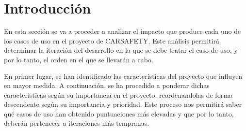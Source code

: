 \section{Introducción}
\par En esta sección se va a proceder a analizar el impacto que produce cada uno de los casos de uso en el proyecto de CARSAFETY. Este análisis permitirá determinar la iteración del desarrollo en la que se debe tratar el caso de uso, y por lo tanto, el orden en el que se llevarán a cabo.

\par En primer lugar, se han identificado las características del proyecto que influyen en mayor medida. A continuación, se ha procedido a ponderar dichas características según su importancia en el proyecto, reordenandolas de forma descendente según su importancia y prioridad. Este proceso nos permitirá saber qué casos de uso han obtenido puntuaciones más elevadas y que por lo tanto, deberán pertenecer a iteraciones más tempranas.

